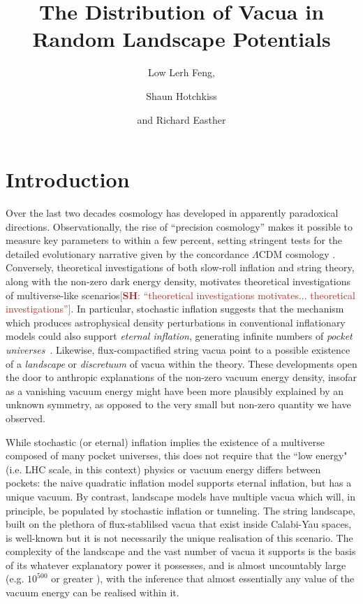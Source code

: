 \documentclass[12pt]{article}
\title{The Distribution of Vacua in Random Landscape Potentials}
\author{Low Lerh Feng,}
\author{Shaun Hotchkiss}
\author{and Richard Easther}
\affiliation{Department of Physics,\\ University of Auckland, \\Private Bag 92019,\\ Auckland, New Zealand}
\newcommand{\SH}[1]{\textcolor{brown}{[{\bf SH}: #1]}}
\begin{document}
\maketitle

\section{Introduction}

Over the last two decades cosmology has developed in apparently paradoxical directions. Observationally, the rise of ``precision cosmology'' makes it possible to measure key parameters to within a few percent, setting stringent tests for the detailed evolutionary narrative given by the concordance $\Lambda$CDM cosmology \cite{Planck2018,DES}. Conversely, theoretical investigations of both slow-roll inflation and string theory, along with the non-zero  dark energy density,  motivates  theoretical investigations of multiverse-like scenarios\SH{``theoretical investigations motivates... theoretical investigations''}. In particular, stochastic inflation \cite{Linde1986,Adshead2007} suggests that the mechanism which produces astrophysical density perturbations in conventional inflationary models could also support {\em eternal inflation\/}, generating infinite numbers of  {\em pocket universes\/}~\cite{Guth2001}. Likewise, flux-compactified string vacua point to a possible existence of a  {\em landscape\/} \cite{Susskind2003} or {\em discretuum\/} \cite{Bousso2000}   of vacua within the theory. These developments open the door to anthropic explanations of the non-zero vacuum energy density, insofar as a vanishing vacuum energy might have been more plausibly explained by an unknown symmetry, as opposed to the very small but non-zero quantity we have observed. 

While stochastic (or eternal) inflation implies the existence of a multiverse composed of many pocket universes,  this does not require that the ``low energy" (i.e. LHC scale, in this context) physics or vacuum energy differs between pockets:  the naive quadratic inflation model supports eternal inflation, but has a unique vacuum.  By contrast, landscape models have multiple vacua which will, in principle, be populated by stochastic inflation or tunneling. The string landscape, built on the plethora of flux-stablilsed vacua that exist inside Calabi-Yau spaces, is well-known but it  is not necessarily the unique realisation of this scenario. The complexity of the landscape  and the vast number of vacua it supports is the basis of its whatever explanatory power it possesses, and is almost uncountably large (e.g. $10^{500}$ or greater \cite{Douglas2003}), with the inference that almost essentially any value of the vacuum energy can be realised within it. 
 
\end{document}
